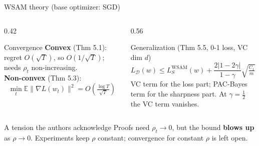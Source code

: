 \documentclass[aspectratio=169,10pt]{beamer}
\newcommand{\norm}[1]{\lVert #1\rVert}
\newcommand{\mt}[1]{\textcolor{muted}{#1}}
\begin{document}
\begin{frame}{WSAM theory (base optimizer: SGD)}
\begin{columns}[T]
\begin{column}{0.42\textwidth}
\begin{block}{Convergence}
\textbf{Convex} (Thm 5.1): regret $O(\sqrt T)$, so $O(1/\sqrt T)$; needs $\rho_t$ non-increasing.\\[4pt]
\textbf{Non-convex} (Thm 5.3):
\[ \min_t \mathbb E\norm{\nabla L(w_t)}^2 = O\!\left(\tfrac{\log T}{\sqrt T}\right) \]
\end{block}
\end{column}
\begin{column}{0.56\textwidth}
\begin{block}{Generalization (Thm 5.5, 0-1 loss, VC dim $d$)}
\footnotesize
\[ L_{\mathcal D}(w)\le L_S^{\mathrm{WSAM}}(w)+\frac{2|1-2\gamma|}{1-\gamma}\sqrt{\tfrac{C_1}{m}}+\frac{\gamma}{1-\gamma}\sqrt{\tfrac{C_2+C_3}{m-1}} \]
\mt{VC term for the loss part; PAC-Bayes term for the sharpness part. At $\gamma=\tfrac12$ the VC term vanishes.}
\end{block}
\end{column}
\end{columns}
\vspace{0.5em}
\begin{alertblock}{A tension the authors acknowledge}
Proofs need $\rho_t\to0$, but the bound \textbf{blows up} as $\rho\to0$. Experiments keep $\rho$ constant; convergence for constant $\rho$ is left open.
\end{alertblock}
\end{frame}
\end{document}
